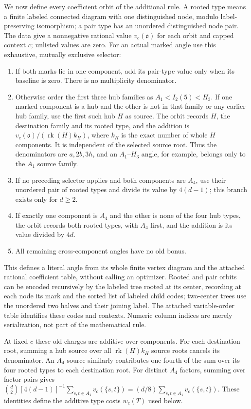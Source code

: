 \documentclass[11pt]{article}
\newcommand{\rk}{\operatorname{rk}}
\begin{document}
We now define every coefficient orbit of the additional rule. A rooted
type means a finite labeled connected diagram with one distinguished
node, modulo label-preserving isomorphism; a pair type has an unordered
distinguished node pair. The data give a nonnegative rational value
$v_c(\mathfrak o)$ for each orbit and capped context $c$; unlisted
values are zero. For an actual marked angle use this exhaustive,
mutually exclusive selector:
\begin{enumerate}
\item If both marks lie in one component, add its pair-type value
only when its baseline is zero. There is no multiplicity denominator.
\item Otherwise order the first three hub families as
$A_1<I_2(5)<H_3$. If one marked component is a hub and the other is
not in that family or any earlier hub family, use the first such hub
$H$ as source. The orbit records $H$, the destination family and its
rooted type, and the addition is $v_c(\mathfrak o)/(\rk(H)k_H)$,
where $k_H$ is the exact number of whole $H$ components. It is
independent of the selected source root. Thus the denominators are
$a,2b,3h$, and an $A_1$--$H_3$ angle, for example, belongs only
to the $A_1$ source family.
\item If no preceding selector applies and both components are
$A_4$, use their unordered pair of rooted types and divide its value
by $4(d-1)$; this branch exists only for $d\ge2$.
\item If exactly one component is $A_4$ and the other is none of the
four hub types, the orbit records both rooted types, with $A_4$ first,
and the addition is its value divided by $4d$.
\item All remaining cross-component angles have no old bonus.
\end{enumerate}
This defines a literal angle from its whole finite vertex diagram and
the attached rational coefficient table, without calling an optimizer.
Rooted and pair orbits can be encoded recursively by the labeled tree
rooted at its center, recording at each node its mark and the sorted
list of labeled child codes; two-center trees use the unordered two
halves and their joining label. The attached variable-order table
identifies these codes and contexts. Numeric column indices are merely
serialization, not part of the mathematical rule.

At fixed $c$ these old charges are additive over components.
For each destination root, summing a hub source over all $\rk(H)k_H$
source roots cancels its denominator. An $A_4$ source similarly
contributes one fourth of the sum over its four rooted types to each
destination root. For distinct $A_4$ factors, summing over factor
pairs gives
$\binom d2[4(d-1)]^{-1}\sum_{s,t\in A_4}v_c(\{s,t\})
=(d/8)\sum_{s,t\in A_4}v_c(\{s,t\})$.
These identities define the additive type costs $w_c(T)$ used below.
\end{document}
